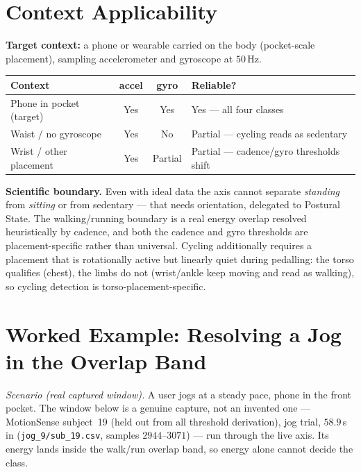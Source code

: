 \section{Context Applicability}

\begin{callout}
\textbf{Target context:} a phone or wearable carried on the body (pocket-scale placement),
sampling accelerometer and gyroscope at $50$\,Hz.
\end{callout}

\begin{center}
\begin{tabular}{@{}>{\raggedright\arraybackslash}p{5.4cm} c c >{\raggedright\arraybackslash}p{3.8cm}@{}}
\toprule
\textbf{Context} & \textbf{accel} & \textbf{gyro} & \textbf{Reliable?} \\
\midrule
Phone in pocket (target)      & Yes & Yes     & Yes --- all four classes \\
Waist / no gyroscope          & Yes & No      & Partial --- cycling reads as sedentary \\
Wrist / other placement       & Yes & Partial & Partial --- cadence/gyro thresholds shift \\
\bottomrule
\end{tabular}
\end{center}

\noindent\textbf{Scientific boundary.} Even with ideal data the axis cannot separate
\emph{standing} from \emph{sitting} or from sedentary --- that needs orientation, delegated
to Postural State. The walking/running boundary is a real energy overlap resolved
heuristically by cadence, and both the cadence and gyro thresholds are placement-specific
rather than universal. Cycling additionally requires a placement that is rotationally active
but linearly quiet during pedalling: the torso qualifies (chest), the limbs do not
(wrist/ankle keep moving and read as walking), so cycling detection is torso-placement-specific.

\section{Worked Example: Resolving a Jog in the Overlap Band}

\noindent\textit{Scenario (real captured window).} A user jogs at a steady pace, phone in the
front pocket. The window below is a genuine capture, not an invented one --- MotionSense
subject~19 (held out from all threshold derivation), jog trial, $58.9$\,s in
(\texttt{jog\_9/sub\_19.csv}, samples $2944$--$3071$) --- run through the live axis. Its
energy lands inside the walk/run overlap band, so energy alone cannot decide the class.

